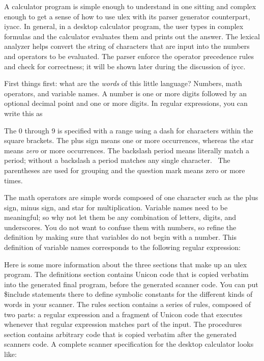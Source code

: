 A calculator program is simple enough to understand in one sitting and
complex enough to get a sense of how to use \textsf{ulex} with its
parser generator counterpart, \textsf{iyacc}. In general, in a desktop
calculator program, the user types in complex formulas and the
calculator evaluates them and prints out the answer.  The lexical
analyzer helps convert the string of characters that are input into
the numbers and operators to be evaluated.  The parser enforce the
operator precedence rules and check for correctness; it will be shown
later during the discussion of iycc.

First things first: what are the \textit{words} of this little language?
Numbers, math operators, and variable names. A number is one or more
digits followed by an optional decimal point and one or more digits. In
regular expressions, you can write this as


The 0 through 9 is specified with a range using a dash for characters
within the square brackets. The plus sign means one or more
occurrences, whereas the star means \textit{zero} or more occurrences.
The backslash period means literally match a period; without a
backslash a period matches any single character. \ The parentheses are
used for grouping and the question mark means zero or more times.

The math operators are simple {\textquotedbl}words{\textquotedbl}
composed of one character such as the plus sign, minus sign, and star
for multiplication. Variable names need to be meaningful; so why not
let them be any combination of letters, digits, and underscores. You do
not want to confuse them with numbers, so refine the definition by
making sure that variables do not begin with a number. This definition
of variable names corresponds to the following regular expression: 

\iconcode{
[a-zA-Z\_][a-zA-Z0-9\_]*}

Here is some more information about the three sections that make up an
\textsf{ulex} program. The definitions section contains Unicon code
that is copied verbatim into the generated final program, before the
generated scanner code. You can put \textsf{\$include} statements there
to define symbolic constants for the different kinds of words in your
scanner. The rules section contains a series of rules, composed of two
parts: a regular expression and a fragment of Unicon code that executes
whenever that regular expression matches part of the input. The
procedures section contains arbitrary code that is copied verbatim
after the generated scanner{\textquotesingle}s code. A complete scanner
specification for the desktop calculator looks like:

